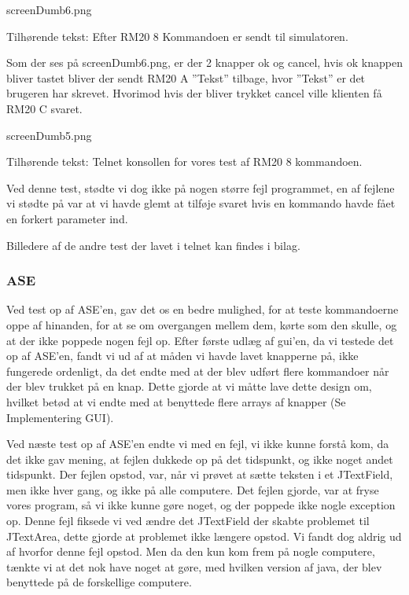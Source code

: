 \documentclass[a4paper]{article}
\begin{document}
\begin{center}
screenDumb6.png

Tilhørende tekst: Efter RM20 8 Kommandoen er sendt til simulatoren.
\end{center}

Som der ses på screenDumb6.png, er der 2 knapper ok og cancel, hvis ok knappen bliver tastet bliver der sendt RM20 A ”Tekst” tilbage, hvor ”Tekst” er det brugeren har skrevet. Hvorimod hvis der bliver trykket cancel ville klienten få RM20 C svaret.

\begin{center}
screenDumb5.png

Tilhørende tekst: Telnet konsollen for vores test af RM20 8 kommandoen.
\end{center}

Ved denne test, stødte vi dog ikke på nogen større fejl programmet, en af fejlene vi stødte på var at vi havde glemt at tilføje svaret hvis en kommando havde fået en forkert parameter ind.

Billedere af de andre test der lavet i telnet kan findes i bilag.


\subsubsection{ASE} %

Ved test op af ASE’en, gav det os en bedre mulighed, for at teste kommandoerne oppe af hinanden, for at se om overgangen mellem dem, kørte som den skulle, og at der ikke poppede nogen fejl op. Efter første udlæg af gui’en, da vi testede det op af ASE’en, fandt vi ud af at måden vi havde lavet knapperne på, ikke fungerede ordenligt, da det endte med at der blev udført flere kommandoer når der blev trukket på en knap. Dette gjorde at vi måtte lave dette design om, hvilket betød at vi endte med at benyttede flere arrays af knapper (Se Implementering GUI).

Ved næste test op af ASE’en endte vi med en fejl, vi ikke kunne forstå kom, da det ikke gav mening, at fejlen dukkede op på det tidspunkt, og ikke noget andet tidspunkt. Der fejlen opstod, var, når vi prøvet at sætte teksten i et JTextField, men ikke hver gang, og ikke på alle computere. Det fejlen gjorde, var at fryse vores program, så vi ikke kunne gøre noget, og der poppede ikke nogle exception op. Denne fejl fiksede vi ved ændre det JTextField der skabte problemet til JTextArea, dette gjorde at problemet ikke længere opstod. Vi fandt dog aldrig ud af hvorfor denne fejl opstod. Men da den kun kom frem på nogle computere, tænkte vi at det nok have noget at gøre, med hvilken version af java, der blev benyttede på de forskellige computere.
\end{document}
